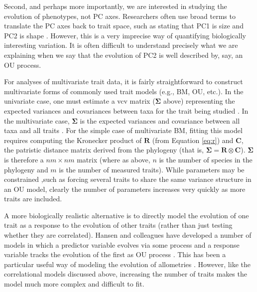 \documentclass[a4paper,12pt]{article}
\begin{document}
Second, and perhaps more importantly, we are interested in studying the evolution of phenotypes, not PC axes. Researchers often use broad terms to translate the PC axes back to trait space, such as stating that PC1 is size and PC2 is shape \citep[e.g.,][]{Harmon2010, Price2014}. However, this is a very imprecise way of quantifying biologically interesting variation. It is often difficult to understand precisely what we are explaining when we say that the evolution of PC2 is well described by, say, an OU process.

For analyses of multivariate trait data, it is fairly straightforward to construct multivariate forms of commonly used trait models (e.g., BM, OU, etc.). In the univariate case, one must estimate a vcv matrix ($\mathbf{\Sigma}$ above) representing the expected variances and covariances between taxa for the trait being studied \citep[see][for details]{Harmon2010, Omeara2012}. In the multivariate case, $\mathbf{\Sigma}$ is the expected variances and covariance between all taxa and all traits \citep{RevellHarmon2008, Hohenlohe2008, RevellCollar2009, ButlerKing2009, motmot}. For the simple case of multivariate BM, fitting this model requires computing the Kronecker product of $\mathbf{R}$ (from Equation \ref{eq:r}) and $\mathbf{C}$, the patristic distance matrix derived from the phylogeny (that is, $\mathbf{\Sigma} = \mathbf{R} \otimes \mathbf{C}$). $\mathbf{\Sigma}$ is therefore a $nm \times nm$ matrix (where as above, $n$ is the number of species in the phylogeny and $m$ is the number of measured traits). While parameters may be constrained ,such as forcing several traits to share the same variance structure in an OU model, clearly the number of parameters increases very quickly as more traits are included.

A more biologically realistic alternative is to directly model the evolution of one trait as a response to the evolution of other traits (rather than just testing whether they are correlated). Hansen and colleagues have developed a number of models in which a predictor variable evolves via some process and a response variable tracks the evolution of the first as OU process \citep{Hansen2008, Labra2009, Hansen2012SysBio, Bartoszek2012}. This has been a particular useful way of modeling the evolution of allometries \citep{Hansen2012SysBio, Voje2013, Voje2013b}. However, like the correlational models discussed above, increasing the number of traits makes the model much more complex and difficult to fit.
\end{document}
